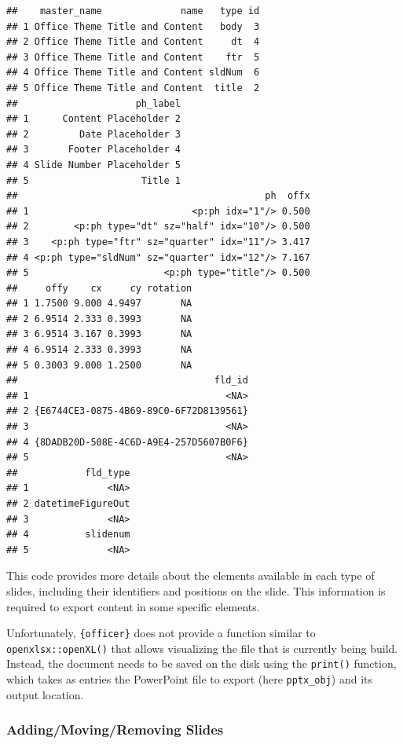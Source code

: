 \documentclass[
]{krantz}
\renewenvironment{quote}{\begin{VF}}{\end{VF}}
\begin{document}
\begin{verbatim}
##    master_name              name   type id
## 1 Office Theme Title and Content   body  3
## 2 Office Theme Title and Content     dt  4
## 3 Office Theme Title and Content    ftr  5
## 4 Office Theme Title and Content sldNum  6
## 5 Office Theme Title and Content  title  2
##                     ph_label
## 1      Content Placeholder 2
## 2         Date Placeholder 3
## 3       Footer Placeholder 4
## 4 Slide Number Placeholder 5
## 5                    Title 1
##                                            ph  offx
## 1                             <p:ph idx="1"/> 0.500
## 2        <p:ph type="dt" sz="half" idx="10"/> 0.500
## 3    <p:ph type="ftr" sz="quarter" idx="11"/> 3.417
## 4 <p:ph type="sldNum" sz="quarter" idx="12"/> 7.167
## 5                        <p:ph type="title"/> 0.500
##     offy    cx     cy rotation
## 1 1.7500 9.000 4.9497       NA
## 2 6.9514 2.333 0.3993       NA
## 3 6.9514 3.167 0.3993       NA
## 4 6.9514 2.333 0.3993       NA
## 5 0.3003 9.000 1.2500       NA
##                                   fld_id
## 1                                   <NA>
## 2 {E6744CE3-0875-4B69-89C0-6F72D8139561}
## 3                                   <NA>
## 4 {8DADB20D-508E-4C6D-A9E4-257D5607B0F6}
## 5                                   <NA>
##            fld_type
## 1              <NA>
## 2 datetimeFigureOut
## 3              <NA>
## 4          slidenum
## 5              <NA>
\end{verbatim}

This code provides more details about the elements available in each type of slides, including their identifiers and positions on the slide. This information is required to export content in some specific elements.

\begin{quote}
Unfortunately, \texttt{\{officer\}} does not provide a function similar to \texttt{openxlsx::openXL()} that allows visualizing the file that is currently being build. Instead, the document needs to be saved on the disk using the \texttt{print()} function, which takes as entries the PowerPoint file to export (here \texttt{pptx\_obj}) and its output location.
\end{quote}

\hypertarget{addingmovingremoving-slides}{%
\subsubsection{Adding/Moving/Removing Slides}\label{addingmovingremoving-slides}}
\end{document}
